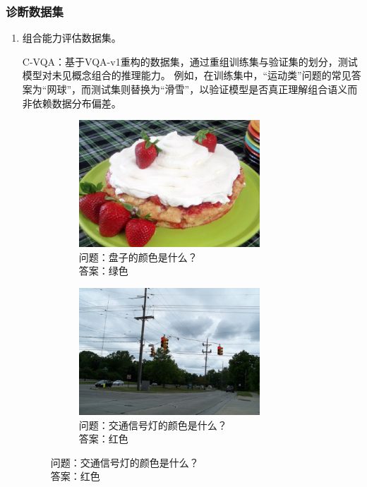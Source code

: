 \subsubsection{诊断数据集}
\begin{enumerate}[itemsep=0pt,parsep=0pt]
    \item 组合能力评估数据集。

​C-VQA\cite{agrawal2017c}：基于VQA-v1重构的数据集，通过重组训练集与验证集的划分，测试模型对未见概念组合的推理能力。
例如，在训练集中，“运动类”问题的常见答案为“网球”，而测试集则替换为“滑雪”，以验证模型是否真正理解组合语义而非依赖数据分布偏差。

\begin{figure}[h]
    \centering
    
    \begin{subfigure}[b]{0.45\textwidth}
        \centering
        \includegraphics[width=0.8\textwidth]{figures/CVQA-A.png}
        \caption*{问题：盘子的颜色是什么？\\答案：绿色}
    \end{subfigure}
    \hfill
    \begin{subfigure}[b]{0.45\textwidth}
        \centering
        \includegraphics[width=0.8\textwidth]{figures/CVQA-B.png}
        \caption*{问题：交通信号灯的颜色是什么？\\答案：红色}
    \end{subfigure}


\end{figure}
\end{enumerate}

